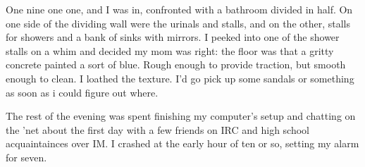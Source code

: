 One nine one one, and I was in, confronted with a bathroom divided in half.  On one side of the dividing wall were the urinals and stalls, and on the other, stalls for showers and a bank of sinks with mirrors.  I peeked into one of the shower stalls on a whim and decided my mom was right: the floor was that a gritty concrete painted a sort of blue.  Rough enough to provide traction, but smooth enough to clean.  I loathed the texture.  I'd go pick up some sandals or something as soon as i could figure out where.

The rest of the evening was spent finishing my computer's setup and chatting on the 'net about the first day with a few friends on IRC and high school acquaintainces over IM.  I crashed at the early hour of ten or so, setting my alarm for seven.
